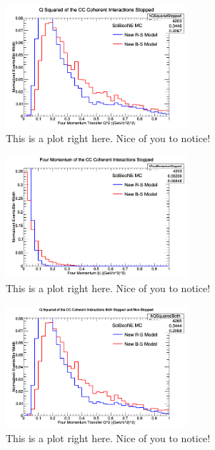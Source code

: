\documentclass[11pt]{article}
\begin{document}
\begin{figure}[H]
\centering
\includegraphics[width=0.6\textwidth]{ANMFourSquaredPlottingImages/3-ANMFourSquaredPlotting.png}
\caption{This is a plot right here. Nice of you to notice!}
\end{figure}

\begin{figure}[H]
\centering
\includegraphics[width=0.6\textwidth]{ANMFourSquaredPlottingImages/4-ANMFourSquaredPlotting.png}
\caption{This is a plot right here. Nice of you to notice!}
\end{figure}

\begin{figure}[H]
\centering
\includegraphics[width=0.6\textwidth]{ANMFourSquaredPlottingImages/5-ANMFourSquaredPlotting.png}
\caption{This is a plot right here. Nice of you to notice!}
\end{figure}
\end{document}
